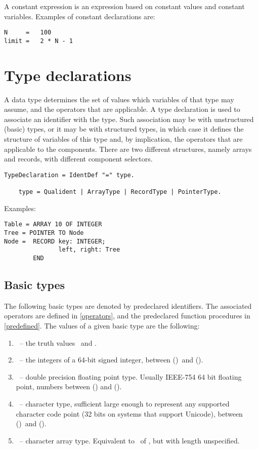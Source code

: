 \documentclass[12pt]{article}
\begin{document}
A constant expression is an expression based on constant values and constant variables. Examples of constant declarations are:

\begin{lstlisting}[style=example]
N     =   100
limit =   2 * N - 1
\end{lstlisting}

\section{Type declarations}
\label{types}

A data type determines the set of values which variables of that type may assume, and the operators that are applicable. A type declaration is used to associate an identifier with the type. Such association may be with unstructured (basic) types, or it may be with structured types, in which case it defines the structure of variables of this type and, by implication, the operators that are applicable to the components. There are two different structures, namely arrays and records, with different component selectors.

\begin{lstlisting}[style=ebnf]
    TypeDeclaration = IdentDef "=" type.

    type = Qualident | ArrayType | RecordType | PointerType.
\end{lstlisting}

Examples:

\begin{lstlisting}[style=example]
Table = ARRAY 10 OF INTEGER
Tree = POINTER TO Node
Node =  RECORD key: INTEGER; 
               left, right: Tree 
        END
\end{lstlisting}

\subsection{Basic types}
\label{types-basic}
The following basic types are denoted by predeclared identifiers. The associated operators are defined in \ref{operators}, and the predeclared function procedures in \ref{predefined}. The values of a given basic type are the following:

\begin{enumerate}
    \item \BOOLEAN\ -- the truth values \TRUE\ and \FALSE.
    \item \INTEGER\ -- the integers of a 64-bit signed integer, between \MIN(\INTEGER)\ and \MAX(\INTEGER).
    \item \REAL\ -- double precision floating point type. Usually IEEE-754 64 bit floating point, numbers between \MIN(\REAL) and \MAX(\REAL).
    \item \CHAR\ -- character type, sufficient large enough to represent any supported character code point (32 bits on systems that support Unicode), between \MIN(\CHAR)\ and \MAX(\CHAR).
    \item \STRING\ -- character array type. Equivalent to \ARRAY\ of \CHAR, but with length unspecified.
\end{enumerate}
\end{document}
